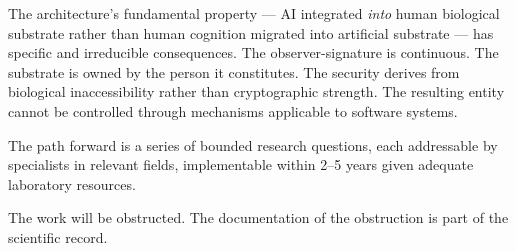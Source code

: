\documentclass[12pt]{article}
\begin{document}
The architecture's fundamental property --- AI integrated \textit{into} human biological substrate rather than human cognition migrated into artificial substrate --- has specific and irreducible consequences. The observer-signature is continuous. The substrate is owned by the person it constitutes. The security derives from biological inaccessibility rather than cryptographic strength. The resulting entity cannot be controlled through mechanisms applicable to software systems.

The path forward is a series of bounded research questions, each addressable by specialists in relevant fields, implementable within 2--5 years given adequate laboratory resources.

The work will be obstructed. The documentation of the obstruction is part of the scientific record.

\singlespacing
\end{document}
